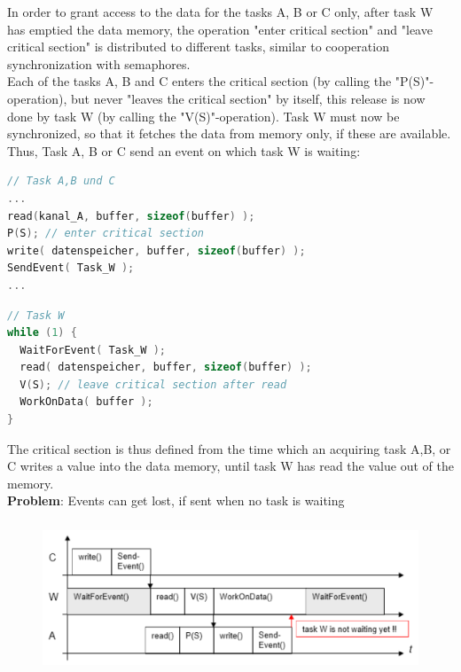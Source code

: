 In order to grant access to the data for the tasks A, B or C only, after task W has emptied the data memory, the operation "enter critical section" and "leave critical section" is distributed to different tasks, similar to cooperation synchronization with semaphores.\\

Each of the tasks A, B and C enters the critical section (by calling the "P(S)"-operation), but never "leaves the critical section" by itself, this release is now done by task W (by calling the "V(S)"-operation). Task W must now be synchronized, so that it fetches the data from memory only, if these are available. Thus, Task A, B or C send an event on which task W is waiting:\\

\begin{lstlisting}[style=mystyle, language=c]
// Task A,B und C
...
read(kanal_A, buffer, sizeof(buffer) );
P(S); // enter critical section
write( datenspeicher, buffer, sizeof(buffer) );
SendEvent( Task_W );
...
\end{lstlisting}

\begin{lstlisting}[style=mystyle, language=c]
// Task W
while (1) {
  WaitForEvent( Task_W );
  read( datenspeicher, buffer, sizeof(buffer) );
  V(S); // leave critical section after read
  WorkOnData( buffer );
}
\end{lstlisting}

The critical section is thus defined from the time which an acquiring task A,B, or C writes a value into the data memory, until task W has read the value out of the memory.\\

\textbf{Problem}: Events can get lost, if sent when no task is waiting

 	\begin{figure}[h]
    \centering
    \includegraphics[width=14cm, height=4.5cm]{Images/image112.png}
    \label{fig:Fig }
    \end{figure}

